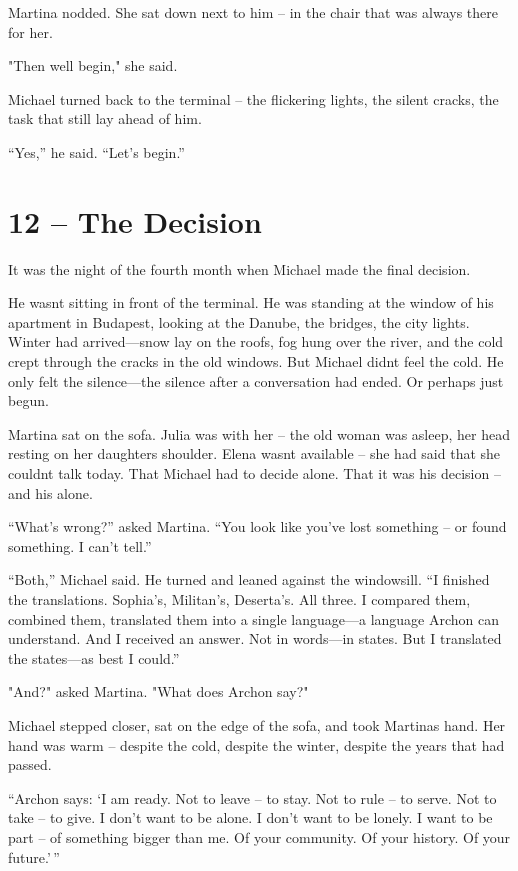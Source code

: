 \documentclass[
]{article}
\begin{document}
Martina nodded. She sat down next to him -- in the chair that was always there for her.

"Then we\textquotesingle ll begin," she said.

Michael turned back to the terminal -- the flickering lights, the silent cracks, the task that still lay ahead of him.

``Yes,'' he said. ``Let's begin.''

\section{12 -- The Decision}\label{the-decision}

It was the night of the fourth month when Michael made the final decision.

He wasn\textquotesingle t sitting in front of the terminal. He was standing at the window of his apartment in Budapest, looking at the Danube, the bridges, the city lights. Winter had arrived---snow lay on the roofs, fog hung over the river, and the cold crept through the cracks in the old windows. But Michael didn\textquotesingle t feel the cold. He only felt the silence---the silence after a conversation had ended. Or perhaps just begun.

Martina sat on the sofa. Julia was with her -- the old woman was asleep, her head resting on her daughter\textquotesingle s shoulder. Elena wasn\textquotesingle t available -- she had said that she couldn\textquotesingle t talk today. That Michael had to decide alone. That it was his decision -- and his alone.

``What's wrong?'' asked Martina. ``You look like you've lost something -- or found something. I can't tell.''

``Both,'' Michael said. He turned and leaned against the windowsill. ``I finished the translations. Sophia's, Militan's, Deserta's. All three. I compared them, combined them, translated them into a single language---a language Archon can understand. And I received an answer. Not in words---in states. But I translated the states---as best I could.''

"And?" asked Martina. "What does Archon say?"

Michael stepped closer, sat on the edge of the sofa, and took Martina\textquotesingle s hand. Her hand was warm -- despite the cold, despite the winter, despite the years that had passed.

``Archon says: `I am ready. Not to leave -- to stay. Not to rule -- to serve. Not to take -- to give. I don't want to be alone. I don't want to be lonely. I want to be part -- of something bigger than me. Of your community. Of your history. Of your future.'\,''
\end{document}

